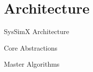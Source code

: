 
\section{Architecture}

\begin{frame}{SysSimX Architecture}
\end{frame}

\begin{frame}{Core Abstractions}
\end{frame}

\begin{frame}{Master Algorithms}
\end{frame}
